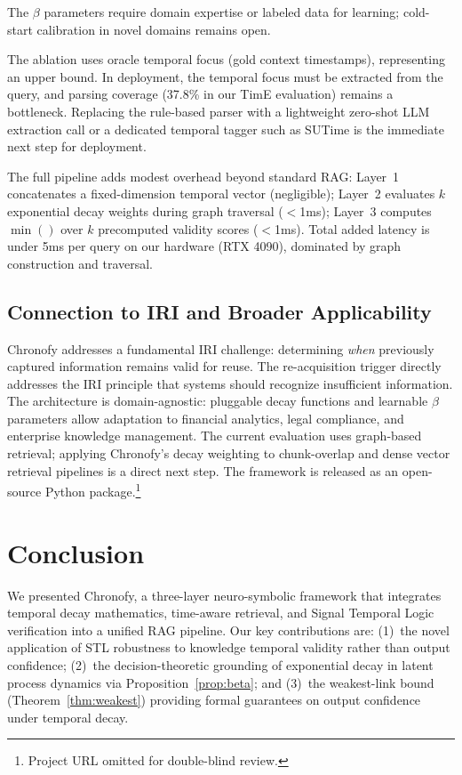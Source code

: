 \documentclass[conference]{IEEEtran}
\newif\ifcameraready
\begin{document}
The $\beta$ parameters require domain expertise or labeled data for learning; cold-start calibration in novel domains remains open.

The ablation uses oracle temporal focus (gold context timestamps), representing an upper bound. In deployment, the temporal focus must be extracted from the query, and parsing coverage (37.8\% in our TimE evaluation) remains a bottleneck. Replacing the rule-based parser with a lightweight zero-shot LLM extraction call or a dedicated temporal tagger such as SUTime is the immediate next step for deployment.

The full pipeline adds modest overhead beyond standard RAG: Layer~1 concatenates a fixed-dimension temporal vector (negligible); Layer~2 evaluates $k$ exponential decay weights during graph traversal ($<$1ms); Layer~3 computes $\min()$ over $k$ precomputed validity scores ($<$1ms). Total added latency is under 5ms per query on our hardware (RTX 4090), dominated by graph construction and traversal.

\subsection{Connection to IRI and Broader Applicability}

Chronofy addresses a fundamental IRI challenge: determining \emph{when} previously captured information remains valid for reuse. The re-acquisition trigger directly addresses the IRI principle that systems should recognize insufficient information. The architecture is domain-agnostic: pluggable decay functions and learnable $\beta$ parameters allow adaptation to financial analytics, legal compliance, and enterprise knowledge management. The current evaluation uses graph-based retrieval; applying Chronofy's decay weighting to chunk-overlap and dense vector retrieval pipelines is a direct next step. The framework is released as an open-source Python package.\ifcameraready\footnote{\url{https://pypi.org/project/chronofy/}}\else\footnote{Project URL omitted for double-blind review.}\fi

\section{Conclusion}

We presented Chronofy, a three-layer neuro-symbolic framework that integrates temporal decay mathematics, time-aware retrieval, and Signal Temporal Logic verification into a unified RAG pipeline. Our key contributions are: (1)~the novel application of STL robustness to knowledge temporal validity rather than output confidence; (2)~the decision-theoretic grounding of exponential decay in latent process dynamics via Proposition~\ref{prop:beta}; and (3)~the weakest-link bound (Theorem~\ref{thm:weakest}) providing formal guarantees on output confidence under temporal decay.
\end{document}
